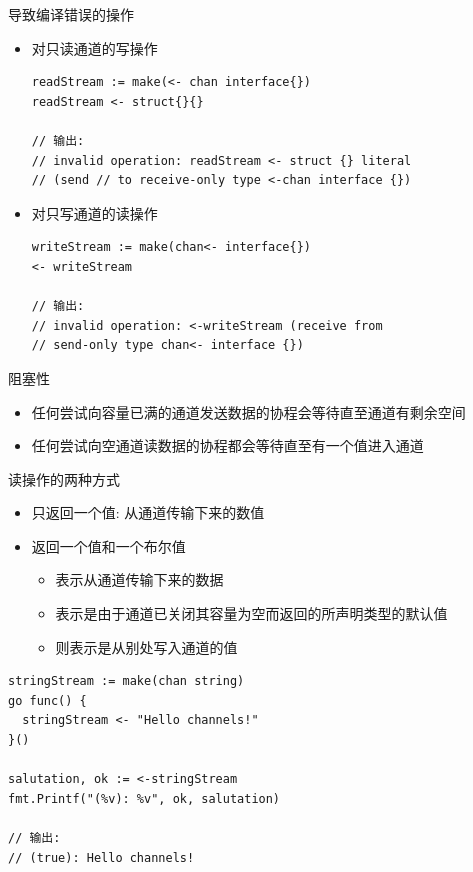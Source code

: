 \begin{frame}[fragile]{导致编译错误的操作}
\begin{itemize}
    \item 对只读通道的写操作
\begin{lstlisting}
readStream := make(<- chan interface{})
readStream <- struct{}{}

// 输出:
// invalid operation: readStream <- struct {} literal 
// (send // to receive-only type <-chan interface {})    
\end{lstlisting}
        \item 对只写通道的读操作
\begin{lstlisting}
writeStream := make(chan<- interface{})
<- writeStream

// 输出:
// invalid operation: <-writeStream (receive from 
// send-only type chan<- interface {})
\end{lstlisting}
\end{itemize}
\end{frame}

\begin{frame}{阻塞性}
    \begin{itemize}
        \item 任何尝试向容量已满的通道发送数据的协程会等待直至通道有剩余空间
        \item 任何尝试向空通道读数据的协程都会等待直至有一个值进入通道
    \end{itemize}
\end{frame}

\begin{frame}[fragile]{读操作的两种方式}
    \begin{itemize}
        \item 只返回一个值: 从通道传输下来的数值
        \item 返回一个值和一个布尔值
            \begin{itemize}
                \item {}表示从通道传输下来的数据
                \item {}表示是由于通道已关闭其容量为空而返回的所声明类型的默认值
                \item {}则表示是从别处写入通道的值
            \end{itemize}
    \end{itemize}

\begin{lstlisting}[caption={通道的两种读取操作}]
stringStream := make(chan string)
go func() {
  stringStream <- "Hello channels!"
}()

salutation, ok := <-stringStream
fmt.Printf("(%v): %v", ok, salutation)

// 输出:
// (true): Hello channels!
\end{lstlisting}
\end{frame}

